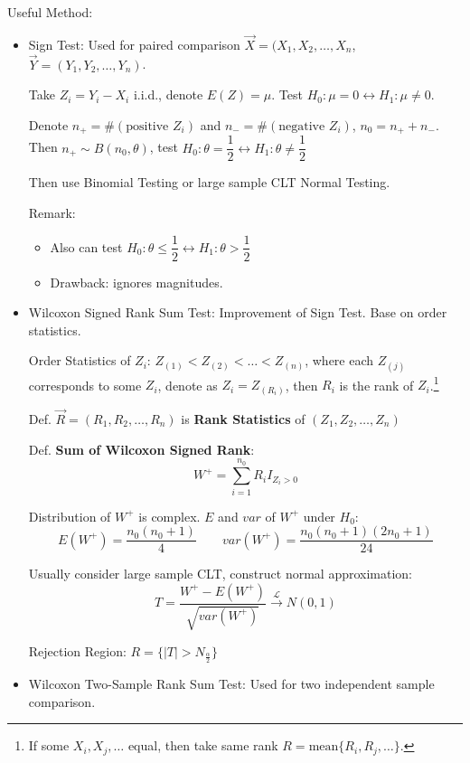     Useful Method:
    \begin{itemize}
        \item Sign Test: Used for paired comparison $\vec{X}=(X_1,X_2,\ldots,X_n$, $\vec{Y}=(Y_1,Y_2,\ldots,Y_n)$.
        
        Take $Z_i=Y_i-X_i$ i.i.d., denote $E(Z)=\mu$. Test $H_0:\mu=0\longleftrightarrow H_1:\mu\neq 0$.

        Denote $n_+=\#(\text{positive } Z_i)$ and $n_-=\#(\text{negative }Z_i)$, $n_0=n_++n_-$. Then $n_+\sim B(n_0,\theta)$, test $H_0:\theta=\dfrac{1}{2}\longleftrightarrow H_1:\theta\neq\dfrac{1}{2}$
        
        Then use Binomial Testing or large sample CLT Normal Testing.

        Remark:
        \begin{itemize}
            \item Also can test $H_0:\theta\leq\dfrac{1}{2}\longleftrightarrow H_1:\theta>\dfrac{1}{2}$
            \item Drawback: ignores magnitudes.
        \end{itemize}
        
        \item Wilcoxon Signed Rank Sum Test: Improvement of Sign Test. Base on order statistics.
        
        Order Statistics of $Z_i$: $Z_{(1)}<Z_{(2)}<\ldots<Z_{(n)}$, where each $Z_{(j)}$ corresponds to some $Z_i$, denote as $Z_i=Z_{(R_i)}$, then $R_i$ is the rank of $Z_i$.\footnote{If some $X_i,X_j,\ldots$ equal, then take same rank $R=\mathrm{mean}\{R_i,R_j,\ldots\}$.}
        
        Def. $\vec{R}=(R_1,R_2,\ldots,R_n)$ is \textbf{Rank Statistics} of $(Z_1,Z_2,\ldots,Z_n)$

        Def. \textbf{Sum of Wilcoxon Signed Rank}: 
        \[
        W^+=\sum_{i=1}^{n_0}R_iI_{Z_i>0} 
        \]

        Distribution of $W^+$ is complex. $E$ and $var$ of $W^+$ under $H_0$:
        \[
        E(W^+)=\frac{n_0(n_0+1)}{4}\qquad var(W^+)=\frac{n_0(n_0+1)(2n_0+1)}{24}    
        \]

        Usually consider large sample CLT, construct normal approximation:
        \[
            T=\frac{W^+-E(W^+)}{\sqrt{var(W^+)}}\xrightarrow[]{\mathscr{L}}N(0,1)
        \]

        Rejection Region: $R=\{|T|>N_\frac{\alpha}{2}\}$

        \item Wilcoxon Two-Sample Rank Sum Test: Used for two independent sample comparison.
        

\end{itemize}
